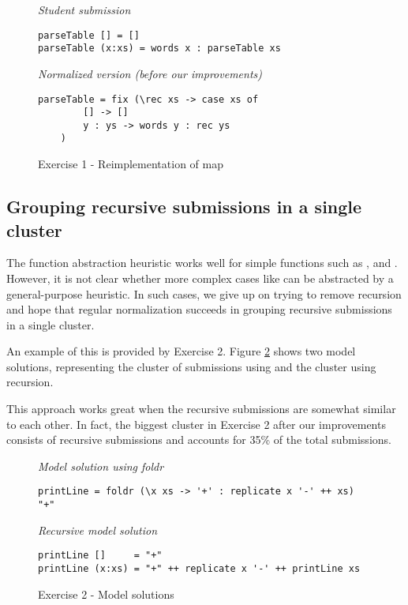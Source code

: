 \begin{figure}
\centering
\emph{Student submission}
\begin{verbatim}
parseTable [] = []
parseTable (x:xs) = words x : parseTable xs
\end{verbatim}
\bigskip
\emph{Normalized version (before our improvements)}
\begin{verbatim}
parseTable = fix (\rec xs -> case xs of
        [] -> []
        y : ys -> words y : rec ys
    )
\end{verbatim}
\caption{Exercise 1 - Reimplementation of map}
\label{fig:ex1-reimplementation-map}
\end{figure}

\subsection{Grouping recursive submissions in a single cluster}

The function abstraction heuristic works well for simple functions such as ,  and . However, it is not clear whether more complex cases like  can be abstracted by a general-purpose heuristic. In such cases, we give up on trying to remove recursion and hope that regular normalization succeeds in grouping recursive submissions in a single cluster.

An example of this is provided by Exercise 2. Figure \ref{fig:ex2-model-solutions} shows two model solutions, representing the cluster of submissions using  and the cluster using recursion.

This approach works great when the recursive submissions are somewhat similar to each other. In fact, the biggest cluster in Exercise 2 after our improvements consists of recursive submissions and accounts for 35\% of the total submissions.

\begin{figure}
\centering
\emph{Model solution using foldr}
\begin{verbatim}
printLine = foldr (\x xs -> '+' : replicate x '-' ++ xs) "+"
\end{verbatim}
\bigskip
\emph{Recursive model solution}
\begin{verbatim}
printLine []     = "+"
printLine (x:xs) = "+" ++ replicate x '-' ++ printLine xs
\end{verbatim}
\caption{Exercise 2 - Model solutions}
\label{fig:ex2-model-solutions}
\end{figure}

